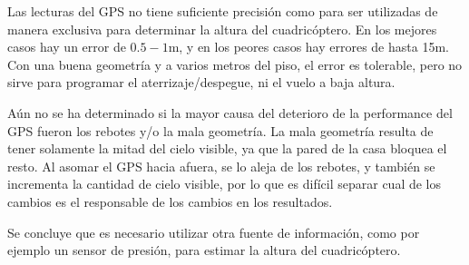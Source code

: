 \documentclass[spanish,12pt,a4paper,titlepage]{report}
\begin{document}
Las lecturas del GPS no tiene suficiente precisión como para ser utilizadas de manera exclusiva para determinar la altura del cuadricóptero. En los mejores casos hay un error de $0.5-1$m, y en los peores casos hay errores de hasta 15m. Con una buena geometría y a varios metros del piso, el error es tolerable, pero no sirve para programar el aterrizaje/despegue, ni el vuelo a baja altura.

Aún no se ha determinado si la mayor causa del deterioro de la performance del GPS fueron los rebotes y/o la mala geometría. La mala geometría resulta de tener solamente la mitad del cielo visible, ya que la pared de la casa bloquea el resto. Al asomar el GPS hacia afuera, se lo aleja de los rebotes, y también se incrementa la cantidad de cielo visible, por lo que es difícil separar cual de los cambios es el responsable de los cambios en los resultados.

Se concluye que es necesario utilizar otra fuente de información, como por ejemplo un sensor de presión, para estimar la altura del cuadricóptero.


%
%
%
%
%
\end{document}
